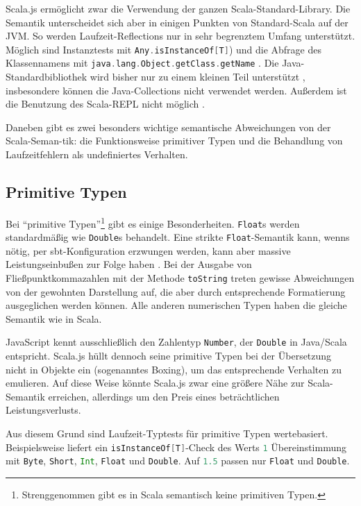 \documentclass[a4paper, 12pt, hidelinks, listof=totoc, listoftables=totoc, bibliography=totoc]{scrreprt}
\newcommand{\scala}[1]{\lstinline[language=Scala, style=inline]|#1|}
\begin{document}
Scala.js ermöglicht zwar die Verwendung der ganzen Scala-Standard-Library. Die Semantik unterscheidet sich aber in einigen Punkten von Standard-Scala auf der JVM. So werden Laufzeit-Reflections nur in sehr begrenztem Umfang unterstützt. Möglich sind Instanztests mit \scala{Any.isInstanceOf[T]}) \cite[S. 2 f.]{doeraene2013.TDI} und die Abfrage des Klassennamens mit \scala{java.lang.Object.getClass.getName} \cite{scalajs.DSS}. Die Java-Standardbibliothek wird bisher nur zu einem kleinen Teil unterstützt \cite{doeraene2014.WHB}, insbesondere können die Java-Collections nicht verwendet werden. Außerdem ist die Benutzung des Scala-\ac{REPL} nicht möglich \cite{doeraene2013.CSJ}.

Daneben gibt es zwei besonders wichtige semantische Abweichungen von der Scala-Seman-tik: die Funktionsweise primitiver Typen und die Behandlung von Laufzeitfehlern als undefiniertes Verhalten.


\subsection{Primitive Typen}\label{subsec:sjs-primitives}

Bei "`primitive Typen"'\footnote{Strenggenommen gibt es in Scala semantisch keine primitiven Typen.} gibt es einige Besonderheiten. \scala{Float}s werden standardmäßig wie \scala{Double}s behandelt. Eine strikte \scala{Float}-Semantik kann, wenns nötig, per sbt-Konfiguration erzwungen werden, kann aber massive Leistungseinbußen zur Folge haben \cite[S.~2]{doeraene2013.TDI} \cite{scalajs.DSS}. 
Bei der Ausgabe von Fließpunktkommazahlen mit der Methode \scala{toString} treten gewisse Abweichungen von der gewohnten Darstellung auf, die aber durch entsprechende Formatierung ausgeglichen werden können. Alle anderen numerischen Typen haben die gleiche Semantik wie in Scala. 

JavaScript kennt ausschließlich den Zahlentyp \scala{Number}, der \scala{Double} in Java/Scala entspricht. Scala.js hüllt dennoch seine primitive Typen bei der Übersetzung nicht in Objekte ein (sogenanntes Boxing), um das entsprechende Verhalten zu emulieren. Auf diese Weise könnte Scala.js zwar eine größere Nähe zur Scala-Semantik erreichen, allerdings um den Preis eines beträchtlichen Leistungsverlusts. \cite[S. 2]{doeraene2013.TDI}\cite[\#ThePerformance/CorrectnessTradeoff]{haoyi.HOS}

Aus diesem Grund sind Laufzeit-Typtests für primitive Typen wertebasiert. Beispielsweise liefert ein \scala{isInstanceOf[T]}-Check des Werts \scala{1} Übereinstimmung mit \scala{Byte}, \scala{Short}, \scala{Int}, \scala{Float} und \scala{Double}. Auf \scala{1.5} passen nur \scala{Float} und \scala{Double}. \cite{scalajs.DSS}
\end{document}
